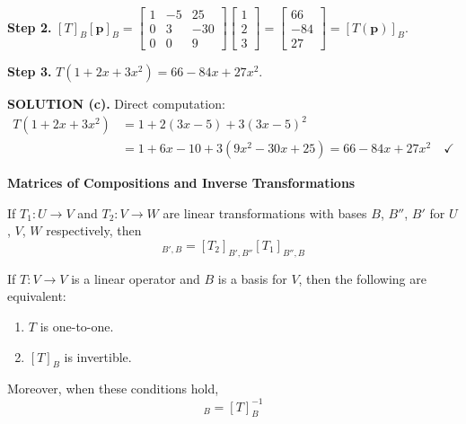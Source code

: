 \documentclass{article}
\newcommand{\redheading}[1]{{\vspace{2mm}\noindent\Large\bfseries\color{red!55!black} #1\par}\vspace{2mm}}
\begin{document}
\textbf{Step 2.} $[T]_B[\mathbf{p}]_B = \begin{bmatrix}1&-5&25\\0&3&-30\\0&0&9\end{bmatrix}
\begin{bmatrix}1\\2\\3\end{bmatrix} = \begin{bmatrix}66\\-84\\27\end{bmatrix} = [T(\mathbf{p})]_B$.

\textbf{Step 3.} $T(1+2x+3x^2) = 66 - 84x + 27x^2$.

\textbf{SOLUTION (c).} Direct computation:
\begin{align*}
  T(1+2x+3x^2) &= 1 + 2(3x-5) + 3(3x-5)^2\\
  &= 1 + 6x-10 + 3(9x^2-30x+25) = 66 - 84x + 27x^2 \quad\checkmark
\end{align*}

\vspace{2mm}
\redheading{Matrices of Compositions and Inverse Transformations}

\begin{tcolorbox}[colback=red!4, colframe=red!60!black,
  title={\textbf{Theorem 8.4.1}}, boxrule=0.5mm, arc=3mm]
If $T_1 : U \to V$ and $T_2 : V \to W$ are linear transformations with bases $B$, $B''$,
$B'$ for $U$, $V$, $W$ respectively, then
\begin{equation}
  [T_2 \circ T_1]_{B',B} = [T_2]_{B',B''}[T_1]_{B'',B} \tag{10}
\end{equation}
\end{tcolorbox}

\begin{tcolorbox}[colback=red!4, colframe=red!60!black,
  title={\textbf{Theorem 8.4.2}}, boxrule=0.5mm, arc=3mm]
If $T : V \to V$ is a linear operator and $B$ is a basis for $V$, then the following
are equivalent:
\begin{enumerate}
  \item[(a)] $T$ is one-to-one.
  \item[(b)] $[T]_B$ is invertible.
\end{enumerate}
Moreover, when these conditions hold,
\begin{equation}
  [T^{-1}]_B = [T]_B^{-1} \tag{11}
\end{equation}
\end{tcolorbox}
\end{document}
